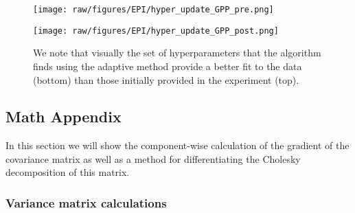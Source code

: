 \documentclass[index]{subfiles}
\begin{document}
\begin{figure}[hpt]
 	\centerline{\texttt{[image: raw/figures/EPI/hyper\_update\_GPP\_pre.png]}}
    \centerline{\texttt{[image: raw/figures/EPI/hyper\_update\_GPP\_post.png]}}
    \caption[Evolution of hyperparameters]{We note that visually the set of hyperparameters that the algorithm finds using the adaptive method provide a better fit to the data (bottom) than those initially provided in the experiment (top).}
 	\label{fig:EPI_hyper_2}
\end{figure}


\subsection{Math Appendix}

In this section we will show the component-wise calculation of the gradient of the covariance matrix as well as a method for differentiating the Cholesky decomposition of this matrix.

\subsubsection{Variance matrix calculations}
\label{EPI_imp_var}
\end{document}
